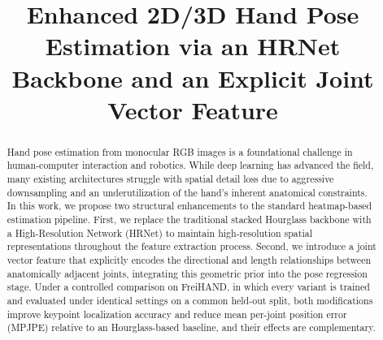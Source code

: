 \documentclass[sigconf, review=true]{acmart}
\begin{document}
\title{Enhanced 2D/3D Hand Pose Estimation via an HRNet Backbone and an Explicit Joint Vector Feature}

















\renewcommand{\shortauthors}{}


\begin{abstract}
Hand pose estimation from monocular RGB images is a foundational challenge in human-computer interaction and robotics. While deep learning has advanced the field, many existing architectures struggle with spatial detail loss due to aggressive downsampling and an underutilization of the hand's inherent anatomical constraints.
In this work, we propose two structural enhancements to the standard heatmap-based estimation pipeline. First, we replace the traditional stacked Hourglass backbone with a High-Resolution Network (HRNet) to maintain high-resolution spatial representations throughout the feature extraction process. Second, we introduce a joint vector feature that explicitly encodes the directional and length relationships between anatomically adjacent joints, integrating this geometric prior into the pose regression stage.
Under a controlled comparison on FreiHAND, in which every variant is trained and evaluated under identical settings on a common held-out split, both modifications improve keypoint localization accuracy and reduce mean per-joint position error (MPJPE) relative to an Hourglass-based baseline, and their effects are complementary.
\end{abstract}

%
%
\end{document}
